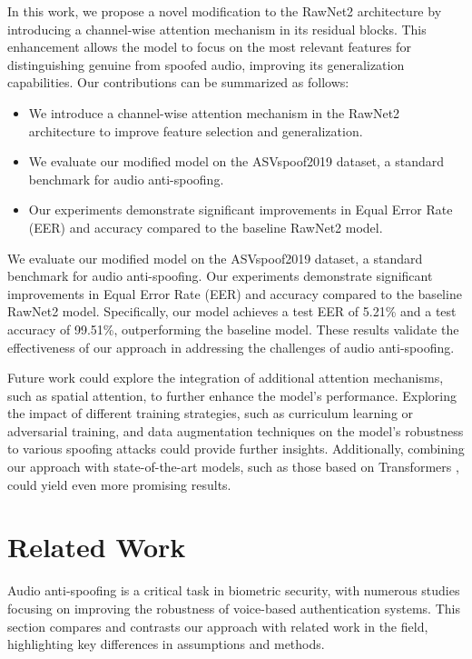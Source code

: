 \documentclass{article} %
\begin{document}
In this work, we propose a novel modification to the RawNet2 architecture by introducing a channel-wise attention mechanism in its residual blocks. This enhancement allows the model to focus on the most relevant features for distinguishing genuine from spoofed audio, improving its generalization capabilities. Our contributions can be summarized as follows:
\begin{itemize}
    \item We introduce a channel-wise attention mechanism in the RawNet2 architecture to improve feature selection and generalization.
    \item We evaluate our modified model on the ASVspoof2019 dataset, a standard benchmark for audio anti-spoofing.
    \item Our experiments demonstrate significant improvements in Equal Error Rate (EER) and accuracy compared to the baseline RawNet2 model.
\end{itemize}

We evaluate our modified model on the ASVspoof2019 dataset, a standard benchmark for audio anti-spoofing. Our experiments demonstrate significant improvements in Equal Error Rate (EER) and accuracy compared to the baseline RawNet2 model. Specifically, our model achieves a test EER of 5.21\% and a test accuracy of 99.51\%, outperforming the baseline model. These results validate the effectiveness of our approach in addressing the challenges of audio anti-spoofing.

Future work could explore the integration of additional attention mechanisms, such as spatial attention, to further enhance the model's performance. Exploring the impact of different training strategies, such as curriculum learning or adversarial training, and data augmentation techniques on the model's robustness to various spoofing attacks could provide further insights. Additionally, combining our approach with state-of-the-art models, such as those based on Transformers \citep{vaswani2017attention}, could yield even more promising results.

\section{Related Work}
\label{sec:related}

Audio anti-spoofing is a critical task in biometric security, with numerous studies focusing on improving the robustness of voice-based authentication systems. This section compares and contrasts our approach with related work in the field, highlighting key differences in assumptions and methods.
\end{document}

